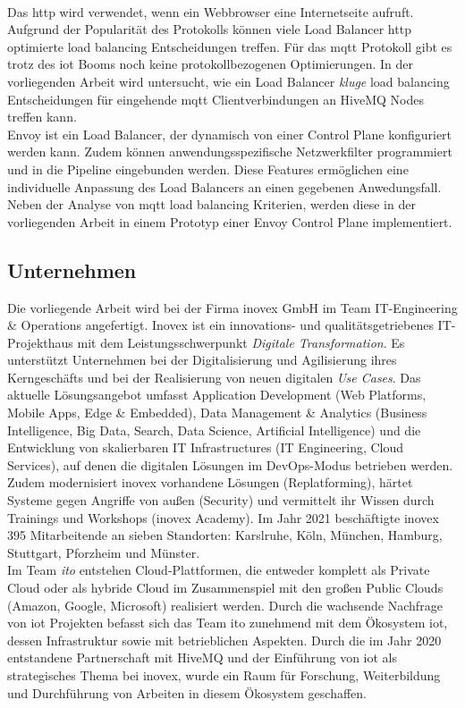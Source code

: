 \\
Das \ac{http} wird verwendet, wenn ein Webbrowser eine Internetseite aufruft. Aufgrund der Popularität des Protokolls können viele Load Balancer \ac{http} optimierte load balancing Entscheidungen treffen.
Für das \ac{mqtt} Protokoll gibt es trotz des \acl{iot} Booms noch keine protokollbezogenen Optimierungen.
In der vorliegenden Arbeit wird untersucht, wie ein Load Balancer \textit{kluge} load balancing Entscheidungen für eingehende \ac{mqtt} Clientverbindungen an HiveMQ Nodes treffen kann.
\\
Envoy ist ein Load Balancer, der dynamisch von einer Control Plane konfiguriert werden kann. Zudem können anwendungsspezifische Netzwerkfilter programmiert und in die Pipeline eingebunden werden. Diese Features ermöglichen eine individuelle Anpassung des Load Balancers an einen gegebenen Anwedungsfall. Neben der Analyse von \ac{mqtt} load balancing Kriterien, werden diese in der vorliegenden Arbeit in einem Prototyp einer Envoy Control Plane implementiert.

\subsection{Unternehmen}
Die vorliegende Arbeit wird bei der Firma inovex GmbH im Team IT-Engineering \& Operations angefertigt.
Inovex ist ein innovations- und qualitätsgetriebenes IT-Projekthaus mit dem Leistungsschwerpunkt \textit{Digitale Transformation}.
Es unterstützt Unternehmen bei der Digitalisierung und Agilisierung ihres Kerngeschäfts und bei der Realisierung von neuen digitalen \textit{Use Cases}.
Das aktuelle Lösungsangebot umfasst Application Development (Web Platforms, Mobile Apps, Edge \& Embedded), Data Management \& Analytics (Business Intelligence, Big Data, Search, Data Science, Artificial Intelligence) und die Entwicklung von skalierbaren IT Infrastructures (IT Engineering, Cloud Services), auf denen die digitalen Lösungen im DevOps-Modus betrieben werden.
Zudem modernisiert inovex vorhandene Lösungen (Replatforming), härtet Systeme gegen Angriffe von au{\ss}en (Security) und vermittelt ihr Wissen durch Trainings und Workshops (inovex Academy).
Im Jahr 2021 beschäftigte inovex 395 Mitarbeitende an sieben Standorten: Karslruhe, Köln, München, Hamburg, Stuttgart, Pforzheim und Münster.
\\
Im Team \textit{\ac{ito}} entstehen Cloud-Plattformen, die entweder komplett als Private Cloud oder als hybride Cloud im Zusammenspiel mit den gro{\ss}en Public Clouds (Amazon, Google, Microsoft) realisiert werden.
Durch die wachsende Nachfrage von \acs{iot} Projekten befasst sich das Team \ac{ito} zunehmend mit dem Ökosystem \acl{iot}, dessen Infrastruktur sowie mit betrieblichen Aspekten.
Durch die im Jahr 2020 entstandene Partnerschaft mit HiveMQ und der Einführung von \ac{iot} als strategisches Thema bei inovex, wurde ein Raum für Forschung, Weiterbildung und Durchführung von Arbeiten in diesem Ökosystem geschaffen.

